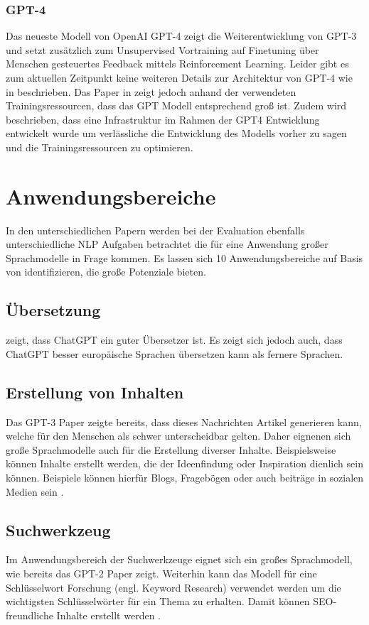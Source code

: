 \documentclass[conference]{IEEEtran}
\begin{document}
\subsubsection{GPT-4}
Das neueste Modell von OpenAI GPT-4 zeigt die Weiterentwicklung von GPT-3 und setzt zusätzlich zum Unsupervised Vortraining auf Finetuning über Menschen gesteuertes Feedback mittels Reinforcement Learning. Leider gibt es zum aktuellen Zeitpunkt keine weiteren Details zur Architektur von GPT-4 wie in \cite{openaiGPT4TechnicalReport2024} beschrieben. Das Paper in \cite{openaiGPT4TechnicalReport2024} zeigt jedoch anhand der verwendeten Trainingsressourcen, dass das GPT Modell entsprechend groß ist. Zudem wird beschrieben, dass eine Infrastruktur im Rahmen der GPT4 Entwicklung entwickelt wurde um verlässliche die Entwicklung des Modells vorher zu sagen und die Trainingsressourcen zu optimieren.

\section{Anwendungsbereiche}
In den unterschiedlichen Papern werden bei der Evaluation ebenfalls unterschiedliche NLP Aufgaben betrachtet die für eine Anwendung großer Sprachmodelle in Frage kommen. Es lassen sich 10 Anwendungsbereiche auf Basis von \cite{keary12PraktischeLarge2023} identifizieren, die große Potenziale bieten.
\subsection{Übersetzung}
\cite{jiaoChatGPTGoodTranslator2023} zeigt, dass ChatGPT ein guter Übersetzer ist. Es zeigt sich jedoch auch, dass ChatGPT besser europäische Sprachen übersetzen kann als fernere Sprachen.
\subsection{Erstellung von Inhalten}
Das GPT-3 Paper \cite{brownLanguageModelsAre2020} zeigte bereits, dass dieses Nachrichten Artikel generieren kann, welche für den Menschen als schwer unterscheidbar gelten. Daher eignenen sich große Sprachmodelle auch für die Erstellung diverser Inhalte. Beispielsweise können Inhalte erstellt werden, die der Ideenfindung oder Inspiration dienlich sein können. Beispiele können hierfür Blogs, Fragebögen oder auch beiträge in sozialen Medien sein \cite{keary12PraktischeLarge2023}.
\subsection{Suchwerkzeug}
Im Anwendungsbereich der Suchwerkzeuge eignet sich ein großes Sprachmodell, wie bereits das GPT-2 Paper \cite{radfordLanguageModelsAre} zeigt. Weiterhin kann das Modell für eine Schlüsselwort Forschung (engl. Keyword Research) verwendet werden um die wichtigsten Schlüsselwörter für ein Thema zu erhalten. Damit können SEO-freundliche Inhalte erstellt werden \cite{keary12PraktischeLarge2023}.
\end{document}
